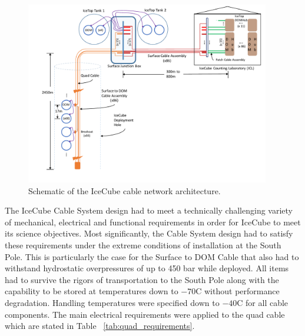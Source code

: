 \begin{figure}
  \centering
  \includegraphics[width=0.95\textwidth]{graphics/cables/cable_system_schematic.pdf}
  \caption{\label{fig:icecube-cables-logical}Schematic of the IceCube cable network architecture.}
\end{figure}

The IceCube Cable System design had to meet a technically challenging
variety of mechanical, electrical and functional requirements in order for
IceCube to meet its science objectives. Most significantly, the Cable
System design had to satisfy these requirements under the extreme
conditions of installation at the South Pole. This is particularly the case
for the Surface to DOM Cable that also had to withstand hydrostatic
overpressures of up to 450 bar while deployed. All items had to survive the
rigors of transportation to the South Pole along with the capability to be
stored at temperatures down to $-70$C without performance
degradation. Handling temperatures were specified down to $-40$C for all
cable components. The main electrical requirements were applied to the quad
cable which are stated in Table ~\ref{tab:quad_requirements}.

